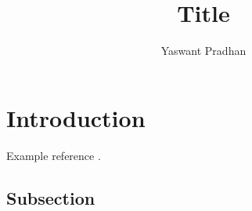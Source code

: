 \documentclass[green, print]{SATM_article}
\title{Title}
\author{Yaswant Pradhan}
\begin{document}
\maketitle
\tableofcontents
\newpage


\section{Introduction}
Example reference \cite{Pradhan2018}.

\subsection{Subsection}



\newpage


\end{document}
